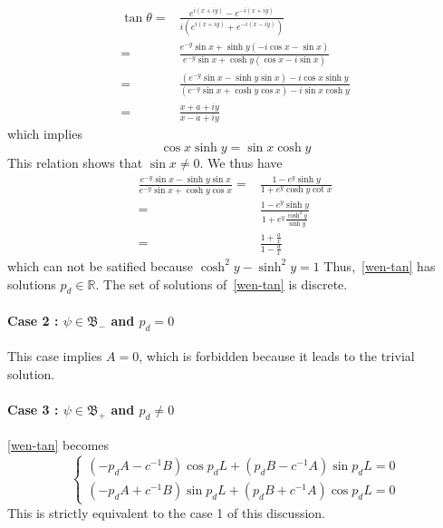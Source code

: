 \begin{equation*}
\begin{split}
\tan \theta = & \frac{e^{i(x+iy)} - e^{-i(x+iy)}}{i(e^{i(x+iy)}+ e^{-i(x-iy)})} \\
= & \frac{e^{-y}\sin x + \sinh y (-i\cos x - \sin x)}{e^{-y}\sin x + \cosh y (\cos x - i\sin x)} \\
= & \frac{(e^{-y}\sin x - \sinh y \sin x )- i\cos x \sinh y}{(e^{-y} \sin x +\cosh y \cos x) - i \sin x \cosh y} \\
=& \frac{x+a+ iy}{x -a +iy}
\end{split}
\end{equation*}
which implies
\begin{equation*}
\cos x \sinh y = \sin x \cosh y
\end{equation*}
This relation shows that $\sin x \neq 0$.
We thus have
\begin{equation*}\begin{split}
\frac{e^{-y}\sin x - \sinh y \sin x}{e^{-y}\sin x + \cosh y \cos x} = &
\frac{1 - e^y \sinh y}{1+ e^y \cosh y \cot x} \\
= &\frac{1 - e^y \sinh y }{1+ e^y \frac{\cosh^2 y }{\sinh y}} \\
=& \frac{1+\frac{a}{x}}{1 - \frac{a}{x}}
\end{split}
\end{equation*}
which can not be satified because $\cosh^2 y - \sinh^2 y =1$
Thus,~\cref{wen-tan} has solutions $p_d \in \mathbb{R}$. The set of solutions of~\cref{wen-tan} is discrete.
\paragraph{Case 2 : $\psi \in \mathfrak{B}_-$ and $p_d = 0$}
This case implies $A = 0$, which is forbidden because it leads to the trivial solution.
%
\paragraph{Case 3 : $\psi \in \mathfrak{B}_+$ and $p_d \neq 0$}
\cref{wen-tan} becomes
\begin{equation*}
\begin{cases}
(-p_d A - c^{-1} B)\cos p_d L + (p_d B - c^{-1}A)\sin p_d L = 0  \\
(-p_d A + c^{-1}B)\sin p_d L + (p_d B + c^{-1} A)\cos p_d L = 0 
\end{cases}
\end{equation*}
This is strictly equivalent to the case 1 of this discussion.
%
